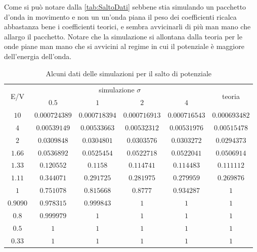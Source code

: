Come si pu\`o notare dalla \autoref{tab:SaltoDati} sebbene stia simulando un pacchetto d'onda in movimento e non un un'onda piana il peso dei coefficienti ricalca abbastanza bene i coefficienti teorici, e sembra avvicinarli di pi\`u man mano che allargo il pacchetto. Notare che la simulazione si allontana dalla teoria per le onde piane man mano che si avvicini al regime in cui il potenziale \`e maggiore dell'energia dell'onda.

\begin{table}[hbt]
  \centering
  \begin{tabular}{cccccc}
    \toprule
    \multirow{2}{*}{E/V} &           \multicolumn{4}{c}{simulazione $\sigma$}            & \multirow{2}{*}{teoria} \\
    \cmidrule(lr){2-5}  &     $0.5$     &      $1$      &      $2$      &      $4$      &  \\ \midrule
    $10$         & $0.000724389$ & $0.000718394$ & $0.000716913$ & $0.000716543$ &      $0.000693482$      \\ \midrule
    $4$          & $0.00539149$  & $0.00533663$  & $0.00532312$  & $0.00531976$  &      $0.00515478$       \\ \midrule
    $2$          &  $0.0309848$  &  $0.0304801$  &  $0.0303576$  &  $0.0303272$  &       $0.0294373$       \\ \midrule
    $1.66$        &  $0.0536892$  &  $0.0525454$  &  $0.0522718$  &  $0.0522041$  &       $0.0506914$       \\ \midrule
    $1.33$        &  $0.120552$   &   $0.1158$    &  $0.114741$   &  $0.114483$   &       $0.111112$        \\ \midrule
    $1.11$        &  $0.344071$   &  $0.291725$   &  $0.281975$   &  $0.279959$   &       $0.269876$        \\ \midrule
    $1$          &  $0.751078$   &  $0.815668$   &   $0.8777$    &  $0.934287$   &           $1$           \\ \midrule
    $0.9090$       &  $0.978315$   &  $0.999843$   &      $1$      &      $1$      &           $1$           \\ \midrule
    $0.8$         &  $0.999979$   &      $1$      &      $1$      &      $1$      &           $1$           \\ \midrule
    $0.5$         &      $1$      &      $1$      &      $1$      &      $1$      &           $1$           \\ \midrule
    $0.33$        &      $1$      &      $1$      &      $1$      &      $1$      &           $1$           \\ \bottomrule
  \end{tabular}
  \caption{Alcuni dati delle simulazioni per il salto di potenziale}\label{tab:SaltoDati}
\end{table}


